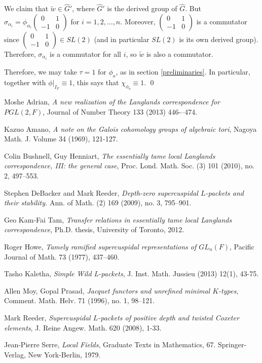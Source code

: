 \documentclass[11pt]{amsart}
\theoremstyle{plain}
\newcommand{\mat}[4]{\left( \begin{array}{cc} {#1} & {#2} \\ {#3} & {#4}
\end{array} \right)}
\begin{document}
We claim that $\tilde{w} \in \hat{G}'$, where $\hat{G}'$ is the derived group of $\hat{G}$.  But $\sigma_{\alpha_i} = \phi_{\alpha_i}\mat{0}{1}{-1}{0}$ for $i = 1, 2, ..., n$.  Moreover, $\mat{0}{1}{-1}{0}$ is a commutator since $\mat{0}{1}{-1}{0} \in SL(2)$ (and in particular $SL(2)$ is its own derived group).  Therefore, $\sigma_{\alpha_i}$ is a commutator for all $i$, so $\tilde{w}$ is also a commutator.

Therefore, we may take $\tau = 1$ for $\phi_o$, as in section \ref{preliminaries}.  In particular, together with $\phi|_{I_F} \equiv 1$, this says that $\chi_{\phi_o} \equiv 1$.
\qed





\begin{thebibliography}{9}

  Moshe Adrian,
  \emph{A new realization of the Langlands correspondence for $PGL(2,F)$}, Journal of Number Theory 133 (2013) 446-–474.

  Kazuo Amano,
  \emph{A note on the Galois cohomology groups of algebraic tori}, Nagoya Math. J. Volume 34 (1969), 121-127.

  Colin Bushnell, Guy Henniart,
  \emph{The essentially tame local Langlands correspondence, III: the general case}, Proc. Lond. Math. Soc. (3) 101 (2010), no. 2, 497–553.

  Stephen DeBacker and Mark Reeder,
  \emph{Depth-zero supercuspidal $L$-packets and their stability.}
  Ann. of Math. (2) 169 (2009), no. 3, 795--901.

  Geo Kam-Fai Tam,
  \emph{Transfer relations in essentially tame local Langlands correspondence}, Ph.D. thesis, University of Toronto, 2012.

  Roger Howe,
  \emph{Tamely ramified supercuspidal representations of $GL_n(F)$},
   Pacific Journal of Math.  73  (1977),  437--460.

  Tasho Kaletha, \emph{Simple Wild L-packets}, J. Inst. Math. Jussieu (2013) 12(1), 43-75.

  Allen Moy, Gopal Prasad,
  \emph{Jacquet functors and unrefined minimal $K$-types},
   Comment. Math. Helv. 71 (1996), no. 1, 98--121.

  Mark Reeder,
  \emph{Supercuspidal $L$-packets of positive depth and twisted Coxeter elements},
  J. Reine Angew. Math. 620 (2008), 1-33.

  Jean-Pierre Serre,
  \emph{Local Fields}, Graduate Texts in Mathematics, 67. Springer-Verlag, New York-Berlin, 1979.

\end{thebibliography}
\end{document}
